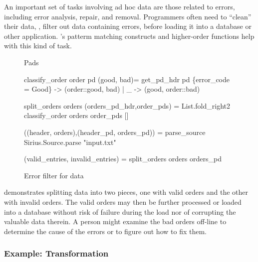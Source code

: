 An important set of tasks involving ad hoc data are those related to
errors, including error analysis, repair, and removal.  Programmers
often need to ``clean'' their data, \ie{}, filter out data containing
errors, before loading it into a database or other application.
\ocaml{}'s patterm matching constructs and higher-order functions help
with this kind of task.

\begin{figure}
\begin{code}\scriptsize
{} Pads

 classify_order order pd (good, bad)=
    get\_pd\_hdr pd 
    \{error_code = Good\} -> (order::good, bad)
   | _                    -> (good, order::bad)

 split_orders orders (orders_pd_hdr,order_pds) = 
   List.fold_right2 classify_order orders order_pds []

 ((header, orders),(header_pd, orders_pd)) = 
   parse_source Sirius.Source.parse "input.txt"

 (valid_entries, invalid_entries) = 
   split_orders orders orders_pd\end{code}
\caption{Error filter for \dibbler{} data}
\label{fig:ex-data-clean}
\end{figure}

 demonstrates
splitting \dibbler{} data into two pieces, one with
valid orders and the other with invalid orders.  The valid
orders may then be further processed or loaded into a database
without risk of failure during the load nor of
corrupting the valuable data therein.  A person might examine
the bad orders off-line to determine the cause of the errors or to figure
out how to fix them.

\subsubsection{Example: Transformation}
\label{sec:ex-trans}

